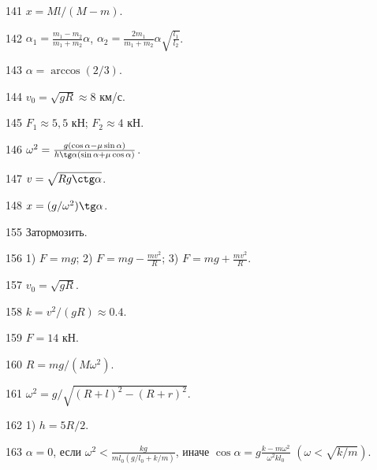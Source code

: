 \begin{Answer}{141}
$x = Ml/(M-m)$.
\end{Answer}
\begin{Answer}{142}
$\alpha_1 =\frac{m_1-m_2}{m_1+m_2}\alpha$, $\alpha_2 =\frac{2m_1}{m_1+m_2}\alpha \sqrt{\frac{l_1}{l_2}}$.
\end{Answer}
\begin{Answer}{143}
$\alpha = \arccos(2/3)$.
\end{Answer}
\begin{Answer}{144}
$v_0 = \sqrt{gR} \approx 8$ км/с.
\end{Answer}
\begin{Answer}{145}
$F_1 \approx 5,5$ кН; $F_2 \approx 4$ кН.
\end{Answer}
\begin{Answer}{146}
$\omega^2 = \frac{g(\cos \alpha - \mu \sin \alpha)}{h \tg \alpha (\sin \alpha + \mu \cos \alpha)}$.
\end{Answer}
\begin{Answer}{147}
$v = \sqrt{Rg \ctg \alpha}$.
\end{Answer}
\begin{Answer}{148}
$x = (g/\omega^2) \tg \alpha$.
\end{Answer}
\begin{Answer}{155}
Затормозить.
\end{Answer}
\begin{Answer}{156}
1) $F=mg$; 2) $F=mg-\frac{mv^2}{R}$; 3) $F=mg+\frac{mv^2}{R}$.
\end{Answer}
\begin{Answer}{157}
$v_0 = \sqrt{gR}$.
\end{Answer}
\begin{Answer}{158}
$k=v^2/(gR) \approx 0.4$.
\end{Answer}
\begin{Answer}{159}
$F = 14$ кН.
\end{Answer}
\begin{Answer}{160}
$R = mg/(M\omega^2)$.
\end{Answer}
\begin{Answer}{161}
$\omega^2 = g/\sqrt{(R+l)^2-(R+r)^2}$.
\end{Answer}
\begin{Answer}{162}
1) $h=5R/2$.
\end{Answer}
\begin{Answer}{163}
$\alpha = 0$, если $\omega^2 < \frac{kg}{ml_0(g/l_0 + k/m)}$, иначе $\cos \alpha = g\frac{k-m\omega^2}{\omega^2kl_0}$ $\left( \omega < \sqrt{k/m} \right)$.
\end{Answer}
